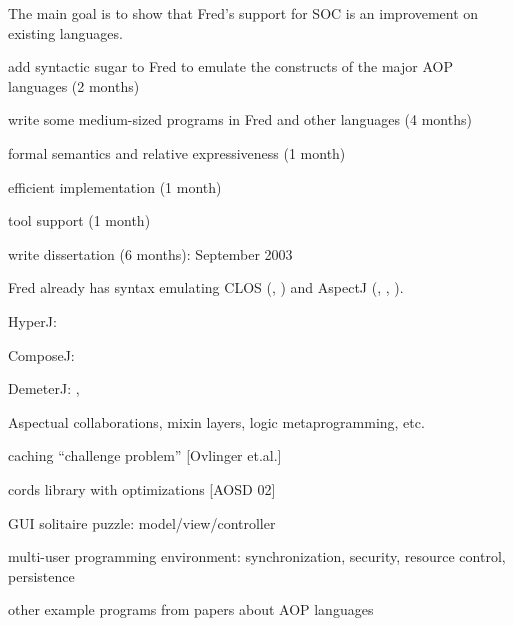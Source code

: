 \documentclass[landscape]{slides}
\begin{document}
\begin{slide}
The main goal is to show that Fred's support for SOC is an improvement
on existing languages.
\begin{bullets}
\item add syntactic sugar to Fred to emulate the constructs of the
      major AOP languages (2 months)
\item write some medium-sized programs in Fred and other languages (4 months)
\item formal semantics and relative expressiveness (1 month)
\item efficient implementation (1 month)
\item tool support (1 month)
\item write dissertation (6 months): September 2003
\end{bullets}
\end{slide}

\begin{slide}
Fred already has syntax emulating CLOS (,
) and AspectJ (, ,
).

\begin{bullets}
\item HyperJ: 
\item ComposeJ: 
\item DemeterJ: , 
\item Aspectual collaborations, mixin layers, logic metaprogramming, etc.
\end{bullets}
\end{slide}

\begin{slide}
\begin{bullets}
\item caching ``challenge problem'' [Ovlinger et.al.]
\item cords library with optimizations [AOSD 02]
\item GUI solitaire puzzle: model/view/controller
\item multi-user programming environment: synchronization, security,
      resource control, persistence
\item other example programs from papers about AOP languages
\end{bullets}
\end{slide}
\end{document}
